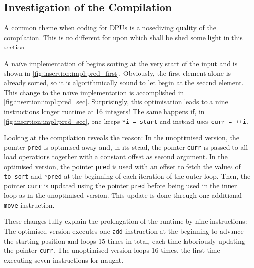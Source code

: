 \subsection*{Investigation of the Compilation}
\label{sec:tasklet:insertion:compilation}

A common theme when coding for DPUs is a nosediving quality of the compilation.
This is no different for \IS{} upon which shall be shed some light in this section.

A naïve implementation of \IS{} begins sorting at the very start of the input and is shown in \cref{fig:insertion:impl:pred_first}.
Obviously, the first element alone is already sorted, so it is algorithmically sound to let \IS{} begin at the second element.
This change to the naïve implementation is accomplished in \cref{fig:insertion:impl:pred_sec}.
Surprisingly, this optimisation leads to a nine instructions longer runtime at 16 integers!
The same happens if, in \cref{fig:insertion:impl:pred_sec}, one keeps \lstinline|*i = start| and instead uses \lstinline|curr = ++i|.

Looking at the compilation reveals the reason:
In the unoptimised version, the pointer \lstinline|pred| is optimised away and, in its stead, the pointer \lstinline|curr| is passed to all load operations together with a constant offset as second argument.
In the optimised version, the pointer \lstinline|pred| is used with an offset to fetch the values of \lstinline|to_sort| and \lstinline|*pred| at the beginning of each iteration of the outer loop.
Then, the pointer \lstinline|curr| is updated using the pointer \lstinline|pred| before being used in the inner loop as in the unoptimised version.
This update is done through one additional \lstinline|move| instruction.

These changes fully explain the prolongation of the runtime by nine instructions:
The optimised version executes one \lstinline|add| instruction at the beginning to advance the starting position and loops 15 times in total, each time laboriously updating the pointer \lstinline|curr|.
The unoptimised version loops 16 times, the first time executing seven instructions for naught.

